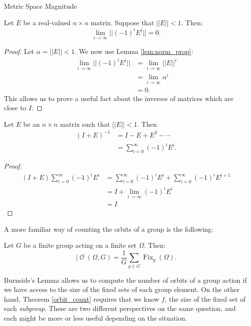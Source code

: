 \documentclass[12pt]{pom_thesis}
\DeclareMathOperator{\fix}{Fix}
\DeclareMathOperator{\orb}{\mathcal{O}}
\begin{document}
\begin{chapter}{Metric Space Magnitude}
\begin{lemma}
Let $E$ be a real-valued $n \times n$ matrix. Suppose that $||E|| < 1$. Then:
\[
\lim_{i \rightarrow \infty}||(-1)^i E^i|| = 0.
\]
\end{lemma}
\begin{proof}
Let $\alpha = ||E|| <1$. We now use Lemma \ref{lem:norm_prop}:
\begin{align*}
\lim_{i \rightarrow \infty}||(-1)^i E^i|| &= \lim_{i \rightarrow \infty}||E||^i\\
&= \lim_{i \rightarrow \infty}\alpha^i\\
&= 0.
\end{align*}
This allows us to prove a useful fact about the inverses of matrices which are close to $I$.
\end{proof}
\begin{lemma}
Let $E$ be an $n \times n$ matrix such that $||E|| < 1$. Then
\begin{align*}
(I + E)^{-1} &= I - E + E^2 - \cdots\\
&= \sum_{i = 0}^\infty(-1)^i E^i.
\end{align*}
\end{lemma}
\begin{proof}
\begin{align*}
(I + E) \sum_{i = 0}^\infty(-1)^i E^i &=  \sum_{i = 0}^\infty (-1)^i E^i  + \sum_{i = 0}^\infty(-1)^i E^{i+1}\\
&= I + \lim_{i \rightarrow \infty}(-1)^iE^i\\
&= I
\end{align*}
\end{proof}
\end{chapter}


























\iffalse


A more familiar way of counting the orbits of a group is the following:
\begin{thm}\label{burnside}
Let $G$ be a finite group acting on a finite set $\Omega$. Then:
\[
|\orb(\Omega, G) = \frac{1}{G}\sum_{g \in G}\fix_g(\Omega).
\]
\end{thm}
Burnside's Lemma allows us to compute the number of orbits of a group action if we have access to the size of the fixed sets of each group element. On the other hand, Theorem \ref{orbit_count} requires that we know $f$, the size of the fixed set of each \emph{subgroup}. These are two different perspectives on the same question, and each might be more or less useful depending on the situation. 
\end{document}
